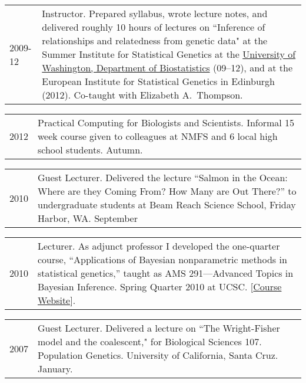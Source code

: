 \documentclass[11pt]{article}
\newlength{\myindent}
\newlength{\scndcol}
\begin{document}
\begin{tabular}{ @{}p{2.5\myindent} p{\scndcol}@{}  }
\hspace*{\myindent}2009-12 &  Instructor.  Prepared syllabus, wrote lecture notes, and delivered roughly 10 hours of lectures on ``Inference of relationships and relatedness from genetic data" at the Summer Institute for Statistical Genetics at the \href{http://www.biostat.washington.edu/}{University of Washington, Department of Biostatistics} (09--12), and at the European Institute for Statistical Genetics in Edinburgh (2012). Co-taught with Elizabeth A.~Thompson.
\end{tabular}


\begin{tabular}{ @{}p{2.5\myindent} p{\scndcol}@{}  }
\hspace*{\myindent}2012 &  Practical Computing for Biologists and Scientists. Informal 15 week course given to colleagues at NMFS and 6 local high school students. Autumn.
\end{tabular}


\begin{tabular}{ @{}p{2.5\myindent} p{\scndcol}@{}  }
\hspace*{\myindent}2010 &  Guest Lecturer.  Delivered the lecture ``Salmon in the Ocean: Where are they Coming From? 
How Many are Out There?'' to undergraduate students at Beam Reach Science School, Friday Harbor, WA. September
\end{tabular}


\begin{tabular}{ @{}p{2.5\myindent} p{\scndcol}@{}  }
\hspace*{\myindent}2010 &  Lecturer.  As adjunct professor I developed the one-quarter course, ``Applications of Bayesian nonparametric methods in statistical genetics,'' taught as AMS 291---Advanced Topics in Bayesian Inference.  Spring Quarter 2010 at UCSC.  [\href{http://www.soe.ucsc.edu/classes/ams291/Spring10/}{Course Website}].
\end{tabular}



\begin{tabular}{ @{}p{2.5\myindent} p{\scndcol}@{}  }
\hspace*{\myindent}2007 &  Guest Lecturer.  Delivered a lecture on ``The Wright-Fisher model and  the coalescent," for Biological Sciences 107. Population Genetics.   University of California, Santa Cruz. January.
\end{tabular}
\end{document}
